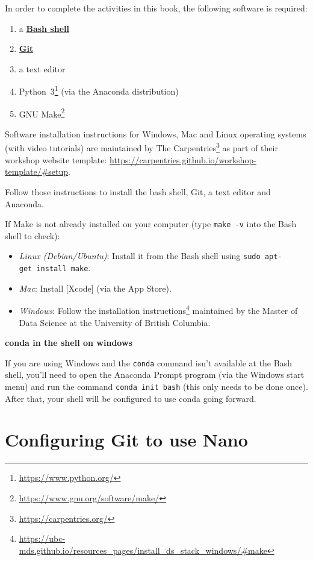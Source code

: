 \documentclass[
]{krantz}
\providecommand{\tightlist}{%
  \setlength{\itemsep}{0pt}\setlength{\parskip}{0pt}}
\renewenvironment{quote}{\begin{VF}}{\end{VF}}
\renewcommand{\href}[2]{#2\footnote{\url{#1}}}
\newcommand{\gref}[2]{\hyperlink{#2}{\textbf{#1}}}
\begin{document}
In order to complete the activities in this book,
the following software is required:

\begin{enumerate}
\def\labelenumi{\arabic{enumi}.}
\item
  a \gref{Bash shell}{shell}
\item
  \gref{Git}{git}
\item
  a text editor
\item
  \href{https://www.python.org/}{Python~3} (via the Anaconda distribution)
\item
  \href{https://www.gnu.org/software/make/}{GNU Make}
\end{enumerate}

Software installation instructions for Windows, Mac and Linux operating systems
(with video tutorials) are maintained by \href{https://carpentries.org/}{The Carpentries}
as part of their workshop website template:
\url{https://carpentries.github.io/workshop-template/\#setup}.

Follow those instructions to install the bash shell, Git, a text editor and Anaconda.

If Make is not already installed on your computer (type \texttt{make\ -v} into the Bash shell to check):

\begin{itemize}
\tightlist
\item
  \emph{Linux (Debian/Ubuntu)}: Install it from the Bash shell using \texttt{sudo\ apt-get\ install\ make}.
\item
  \emph{Mac}: Install {[}Xcode{]} (via the App Store).
\item
  \emph{Windows}: Follow the \href{https://ubc-mds.github.io/resources_pages/install_ds_stack_windows/\#make}{installation instructions} maintained by the
  Master of Data Science at the University of British Columbia.
\end{itemize}

\begin{quote}
\textbf{conda in the shell on windows}

If you are using Windows and the \texttt{conda} command isn't available at the Bash shell,
you'll need to open the Anaconda Prompt program (via the Windows start menu)
and run the command \texttt{conda\ init\ bash} (this only needs to be done once).
After that, your shell will be configured to use conda going forward.
\end{quote}

\hypertarget{install-git-nano}{%
\section{Configuring Git to use Nano}\label{install-git-nano}}
\end{document}
